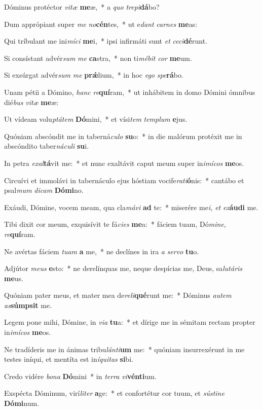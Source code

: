 \item Dóminus protéctor \textit{vitæ} \textbf{me}æ,~* a \textit{quo} \textit{trepi}\textbf{dá}bo?
\item Dum apprópiant super \textit{me} \textit{no}\textbf{cén}tes,~* ut e\textit{dant} \textit{carnes} \textbf{me}as:
\item Qui tríbulant me ini\textit{míci} \textbf{me}i,~* ipsi infirmáti sunt \textit{et} \textit{ceci}\textbf{dé}runt.
\item Si consístant advér\textit{sum} \textit{me} \textbf{ca}stra,~* non ti\textit{mébit} \textit{cor} \textbf{me}um.
\item Si exsúrgat advér\textit{sum} \textit{me} \textbf{prǽ}lium,~* in hoc \textit{ego} \textit{spe}\textbf{rá}bo.
\item Unam pétii a Dómino, \textit{hanc} \textit{re}\textbf{quí}ram,~* ut inhábitem in domo Dómini ómnibus dié\textit{bus} \textit{vitæ} \textbf{me}æ:
\item Ut vídeam volu\textit{ptátem} \textbf{Dó}mini,~* et vísi\textit{tem} \textit{templum} \textbf{e}jus.
\item Quóniam abscóndit me in taberná\textit{culo} \textbf{su}o:~* in die malórum protéxit me in abscóndito taber\textit{náculi} \textbf{su}i.
\item In petra \textit{exal}\textbf{tá}vit me:~* et nunc exaltávit caput meum super in\textit{imícos} \textbf{me}os.
\item Circuívi et immolávi in tabernáculo ejus hóstiam vocife\textit{rati}\textbf{ó}nis:~* cantábo et psal\textit{mum} \textit{dicam} \textbf{Dó}\textbf{mi}no.
\item Exáudi, Dómine, vocem meam, qua cla\textit{mávi} \textbf{ad} te:~* miserére me\textit{i,} \textit{et} \textit{ex}\textbf{áu}\textbf{di} me.
\item Tibi dixit cor meum, exquisívit te fá\textit{cies} \textbf{me}a:~* fáciem tuam, Dó\textit{mine,} \textit{re}\textbf{quí}ram.
\item Ne avértas fáciem \textit{tuam} \textbf{a} me,~* ne declínes in ira \textit{a} \textit{servo} \textbf{tu}o.
\item Adjútor \textit{meus} \textbf{e}sto:~* ne derelínquas me, neque despícias me, Deus, sa\hspace{0.03em}\textit{lutáris} \textbf{me}us.
\item Quóniam pater meus, et mater mea de\textit{reli}\textbf{qué}runt me:~* Dóminus \textit{autem} \textit{as}\textbf{súm}\textbf{psit} me.
\item Legem pone mihi, Dómine, in \textit{via} \textbf{tu}a:~* et dírige me in sémitam rectam propter in\textit{imícos} \textbf{me}os.
\item Ne tradíderis me in ánimas tribu\textit{lánti}\textbf{um} me:~* quóniam insurrexérunt in me testes iníqui, et mentíta est in\textit{íquitas} \textbf{si}bi.
\item Credo vidére \textit{bona} \textbf{Dó}mini~* in \textit{terra} \textit{vi}\textbf{vén}\textbf{ti}um.
\item Exspécta Dóminum, virí\hspace{0.01em}\textit{liter} \textbf{a}ge:~* et confortétur cor tuum, et \textit{sústine} \textbf{Dó}\textbf{mi}num.
